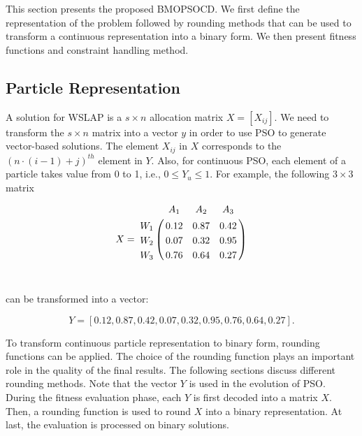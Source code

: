 \documentclass[10pt,journal,compsoc]{IEEEtran}
\let\bbordermatrix\bordermatrix
\begin{document}
This section presents the proposed BMOPSOCD. We first define the representation of the problem followed by rounding methods that can be used to transform a continuous representation into a binary form. We then present fitness functions and constraint handling method.

\vspace{-3 mm}
\subsection{Particle Representation}
A solution for WSLAP is a $s \times n$ allocation matrix $X =[X_{ij}]$. We need to transform the $s \times n$ matrix into a vector $y$ in order to use PSO to generate vector-based solutions. The element $X_{ij}$ in $X$ corresponds to the $ (n \cdot (i-1) +j)^{th}$ element in $Y$. Also, for continuous PSO, each element of a particle takes value from 0 to 1, i.e., $0 \leq  Y_u  \leq 1$. For example, the following $3 \times 3$ matrix

\begin{small}
\begin{equation*}
\begin{aligned}
 X = \bbordermatrix{~ & A_{1} & A_{2} & A_{3} \cr
      W_{1} &0.12 &0.87 &0.42 \cr
      W_{2} &0.07  &0.32 &0.95 \cr
      W_{3} &0.76 &0.64 &0.27 \cr}\\
\end{aligned}
\end{equation*}\\
\end{small}
can be transformed into a vector:
\begin{small}
$$
Y = [0.12, 0.87, 0.42, 0.07, 0.32, 0.95, 0.76, 0.64, 0.27].
$$
\end{small}

To transform continuous particle representation to binary form, rounding functions can be applied. The choice of the rounding function plays an important role in the quality of the final results. The following sections discuss different rounding methods. Note that the vector $Y$ is used in the evolution of PSO. During the fitness evaluation phase, each $Y$ is first decoded into a matrix $X$. Then, a rounding function is used to round $X$ into a binary representation. At last, the evaluation is processed on binary solutions.
\end{document}
